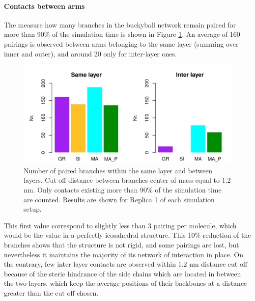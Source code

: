 \paragraph{Contacts between arms} The measure how many branches in the buckyball network remain paired for more than 90\% of the simulation time is shown in Figure \ref{fig:BTI_beta}. An average of 160 pairings is observed between arms belonging to the same layer (summing over inner and outer), and around 20 only for inter-layer ones.
%
\begin{figure}[t]
\centering
\includegraphics[width=0.85\linewidth]{3results_capsule/pics/stAll_beta_90_R1.png}
\caption[Branch pairing during simulations of the buckyball]{Number of paired branches within the same layer and between layers. Cut off distance between branches center of mass equal to 1.2 nm. Only contacts existing more than 90\% of the simulation time are counted. Results are shown for Replica 1 of each simulation setup.}
\label{fig:BTI_beta}
\end{figure}
%
This first value correspond to slightly less than 3 pairing per molecule, which would be the value in a perfectly icosahedral structure. This 10\% reduction of the branches shows that the structure is not rigid, and some pairings are lost, but nevertheless it maintains the majority of its network of interaction in place.
%
On the contrary, few inter layer contacts are observed within 1.2 nm distance cut off because of the steric hindrance of the side chains which are located in between the two layers, which keep the average positions of their backbones at a distance greater than the cut off chosen.

